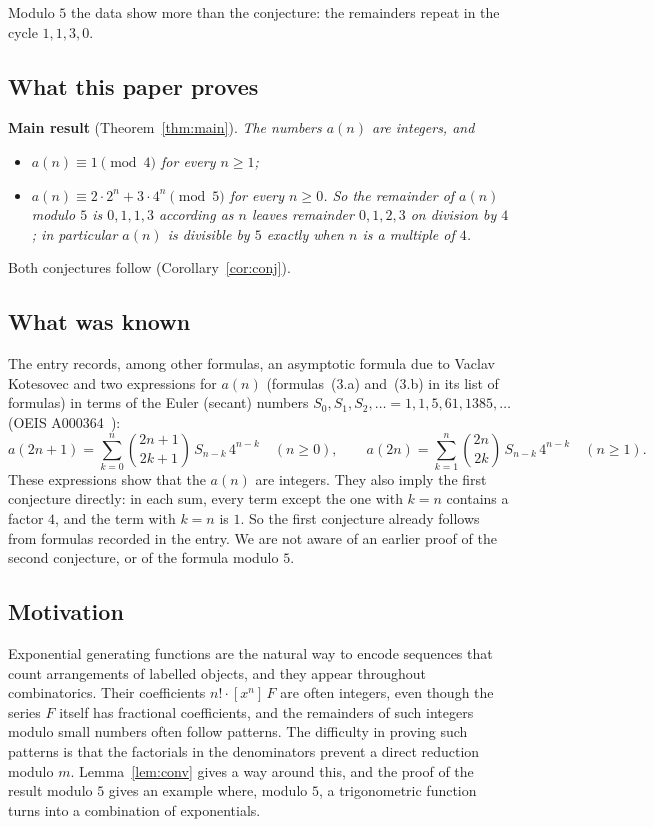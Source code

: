 \documentclass[11pt,a4paper]{article}
\theoremstyle{definition}
\theoremstyle{remark}
\newcommand{\coeff}[2]{[x^{#1}]\,#2}
\begin{document}
Modulo $5$ the data show more than the conjecture: the remainders repeat in the cycle $1,1,3,0$.

\subsection{What this paper proves}
\textbf{Main result} (Theorem~\ref{thm:main}). \emph{The numbers $a(n)$ are integers, and}
\begin{itemize}
\item \emph{$a(n)\equiv1\pmod4$ for every $n\ge1$;}
\item \emph{$a(n)\equiv2\cdot2^n+3\cdot4^n\pmod5$ for every $n\ge0$. So the remainder of $a(n)$ modulo $5$ is $0,1,1,3$
according as $n$ leaves remainder $0,1,2,3$ on division by $4$; in particular $a(n)$ is divisible by $5$ exactly when
$n$ is a multiple of $4$.}
\end{itemize}
Both conjectures follow (Corollary~\ref{cor:conj}).

\subsection{What was known}
The entry records, among other formulas, an asymptotic formula due to Vaclav Kotesovec and two expressions for $a(n)$
(formulas~(3.a) and~(3.b) in its list of formulas) in terms of the Euler (secant) numbers $S_0,S_1,S_2,\dots=1,1,5,61,1385,\dots$
(OEIS A000364~\cite{oeissec}):
\[
a(2n+1)=\sum_{k=0}^{n}\binom{2n+1}{2k+1}\,S_{n-k}\,4^{n-k}\quad(n\ge0),\qquad
a(2n)=\sum_{k=1}^{n}\binom{2n}{2k}\,S_{n-k}\,4^{n-k}\quad(n\ge1).
\]
These expressions show that the $a(n)$ are integers. They also imply the first conjecture directly: in each sum, every
term except the one with $k=n$ contains a factor $4$, and the term with $k=n$ is $1$. So the first conjecture already
follows from formulas recorded in the entry. We are not aware of an earlier proof of the second conjecture, or of the
formula modulo $5$.

\subsection{Motivation}
Exponential generating functions are the natural way to encode sequences that count arrangements of labelled objects,
and they appear throughout combinatorics. Their coefficients $n!\cdot\coeff{n}{F}$ are often integers, even though the
series $F$ itself has fractional coefficients, and the remainders of such integers modulo small numbers often follow
patterns. The difficulty in proving such patterns is that the factorials in the denominators prevent a direct
reduction modulo $m$. Lemma~\ref{lem:conv} gives a way around this, and the proof of the result modulo $5$ gives an
example where, modulo $5$, a trigonometric function turns into a combination of exponentials.
\end{document}
